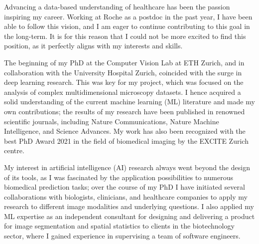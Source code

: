 \documentclass[10pt, letter]{ag-cv} %
\begin{document}
\makecvheader %

\makelettertitlenorec %


\begin{cvletter}






\begin{flushleft}
Advancing a data-based understanding of healthcare has been the passion inspiring my career. Working at Roche as a postdoc in the past year, I have been able to follow this vision, and I am eager to continue contributing to this goal in the long-term. It is for this reason that I could not be more excited to find this position, as it perfectly aligns with my interests and skills. 

The beginning of my PhD at the Computer Vision Lab at ETH Zurich, and in collaboration with the University Hospital Zurich, coincided with the surge in deep learning research. This was key for my project, which was focused on the analysis of complex multidimensional microscopy datasets. I hence acquired a solid understanding of the current machine learning (ML) literature and made my own contributions; the results of my research have been published in renowned scientific journals, including Nature Communications, Nature Machine Intelligence, and Science Advances. My work has also been recognized with the best PhD Award 2021 in the field of biomedical imaging by the EXCITE Zurich centre. 

My interest in artificial intelligence (AI) research always went beyond the design of its tools, as I was fascinated by the application possibilities to numerous biomedical prediction tasks; over the course of my PhD I have initiated several collaborations with biologists, clinicians, and healthcare companies to apply my research to different image modalities and underlying questions. I also applied my ML expertise as an independent consultant for designing and delivering a product for image segmentation and spatial statistics to clients in the biotechnology sector, where I gained experience in supervising a team of software engineers.  
 

\end{flushleft}
\end{cvletter}
\end{document}
